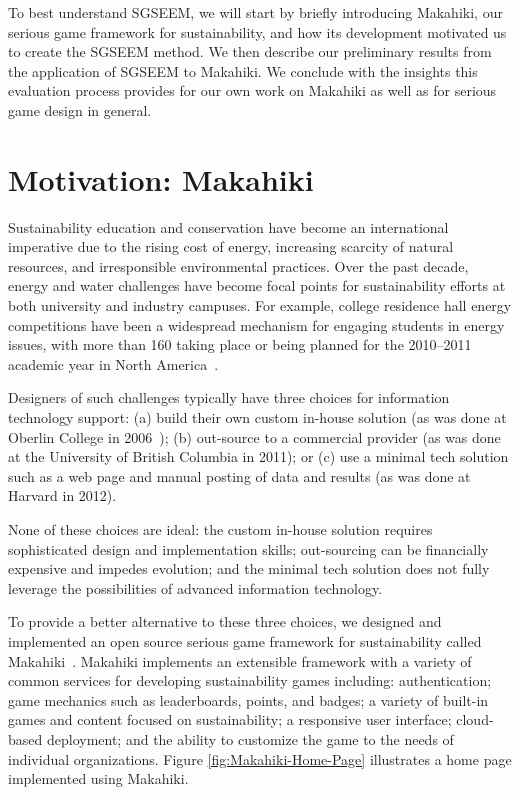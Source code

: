 \documentclass{sigchi}
\begin{document}
To best understand SGSEEM, we will start by briefly introducing Makahiki, our serious game
framework for sustainability, and how its development motivated us to create the SGSEEM method. We then describe our preliminary
results from the application of SGSEEM to Makahiki. We conclude with the insights this
evaluation process provides for our own work on Makahiki as well as for serious game
design in general.


\section{Motivation: Makahiki}

Sustainability education and conservation have become an international
imperative due to the rising cost of energy, increasing scarcity of
natural resources, and irresponsible environmental practices. Over the
past decade, energy and water challenges have become focal
points for sustainability efforts at both university and industry
campuses. For example, college residence hall energy competitions have
been a widespread mechanism for engaging students in energy issues,
with more than 160 taking place or being planned for the 2010--2011
academic year in North America~\cite{Hodge2010}.

Designers of such challenges typically have three choices for
information technology support: (a) build their own custom in-house
solution (as was done at Oberlin College in
2006~\cite{petersen-dorm-energy-reduction}); (b) out-source to a
commercial provider (as was done at the University of British Columbia
in 2011); or (c) use a minimal tech solution such as a web page and
manual posting of data and results (as was done at Harvard in 2012).

None of these choices are ideal: the custom in-house solution requires
sophisticated design and implementation skills; out-sourcing can be
financially expensive and impedes evolution; and the minimal tech
solution does not fully leverage the possibilities of advanced
information technology.

To provide a better alternative to these three choices, we designed and implemented
an open source serious game framework for sustainability called
Makahiki~\cite{csdl2-12-06}.  Makahiki implements an extensible framework with a variety
of common services for developing sustainability games including: authentication; game
mechanics such as leaderboards, points, and badges; a variety of built-in games and
content focused on sustainability; a responsive user interface; cloud-based deployment;
and the ability to customize the game to the needs of individual organizations.  
Figure \ref{fig:Makahiki-Home-Page} illustrates a home page implemented using Makahiki.
\end{document}

